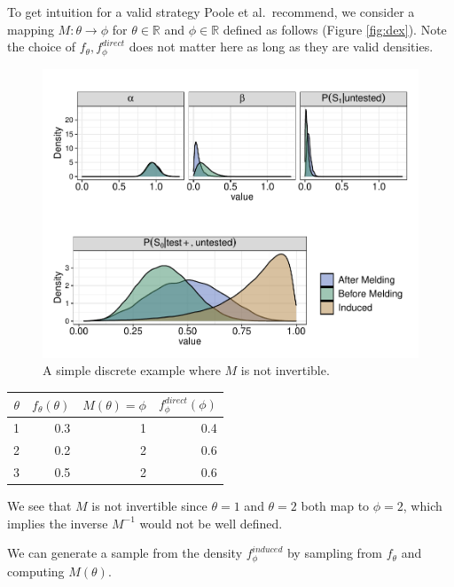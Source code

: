 \documentclass[12pt,twoside]{smiththesis}
\begin{document}
To get intuition for a valid strategy Poole et al.~recommend, we consider a mapping \(M: \theta \to \phi\) for \(\theta \in \mathbb{R}\) and \(\phi \in \mathbb{R}\)
defined as follows (Figure \ref{fig:dex}). Note the choice of \(f_\theta,f_\phi^{direct}\) does not matter here as long as they are valid densities.
\begin{multicols}{2}
\begin{figure}

{\centering \includegraphics{thesis_files/figure-latex/unnamed-chunk-12-1} 

}

\caption{\label{fig:dex}A simple discrete example where $M$ is not invertible.}\label{fig:unnamed-chunk-12}
\end{figure}
\columnbreak
\begin{table}[H]
\centering
\begin{tabular}[t]{r|r|r|r}
\hline
$\theta$ & $f_\theta(\theta)$ & $M(\theta)=\phi$ & $f_\phi^{direct}(\phi)$\\
\hline
1 & 0.3 & 1 & 0.4\\
\hline
2 & 0.2 & 2 & 0.6\\
\hline
3 & 0.5 & 2 & 0.6\\
\hline
\end{tabular}
\end{table}
\end{multicols}
We see that \(M\) is not invertible since \(\theta=1\) and \(\theta = 2\) both map to \(\phi=2\), which implies the inverse \(M^{-1}\) would not be well defined.

We can generate a sample from the density \(f_\phi^{induced}\) by sampling from \(f_\theta\) and computing \(M(\theta)\).
\end{document}
